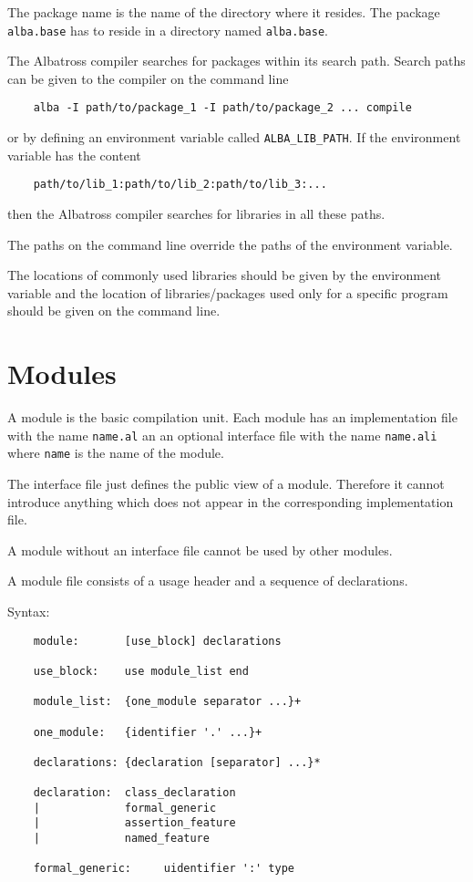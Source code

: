 The package name is the name of the directory where it resides. The package
\lstinline!alba.base! has to reside in a directory named \lstinline!alba.base!.

The Albatross compiler searches for packages within its search path. Search
paths can be given to the compiler on the command line
\begin{lstlisting}
    alba -I path/to/package_1 -I path/to/package_2 ... compile
\end{lstlisting}
or by defining an environment variable called \lstinline!ALBA_LIB_PATH!. If the
environment variable has the content
%
\begin{lstlisting}
    path/to/lib_1:path/to/lib_2:path/to/lib_3:...
\end{lstlisting}
%
then the Albatross compiler searches for libraries in all these paths.

The paths on the command line override the paths of the environment variable.

The locations of commonly used libraries should be given by the environment
variable and the location of libraries/packages used only for a specific
program should be given on the command line.



\section{Modules}

A module is the basic compilation unit. Each module has an implementation file
with the name \lstinline!name.al! an an optional interface file with the name
\lstinline!name.ali!  where \lstinline!name! is the name of the module.

The interface file just defines the public view of a module. Therefore it
cannot introduce anything which does not appear in the corresponding
implementation file.

A module without an interface file cannot be used by other modules.

A module file consists of a usage header and a sequence of declarations.

\noindent Syntax:
\begin{lstlisting}
    module:       [use_block] declarations

    use_block:    use module_list end

    module_list:  {one_module separator ...}+

    one_module:   {identifier '.' ...}+

    declarations: {declaration [separator] ...}*

    declaration:  class_declaration
    |             formal_generic
    |             assertion_feature
    |             named_feature

    formal_generic:     uidentifier ':' type
\end{lstlisting}

